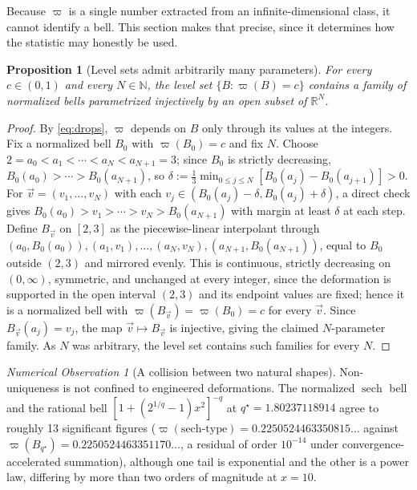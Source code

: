 \documentclass[11pt]{article}
\theoremstyle{definition}
\theoremstyle{plain}
\newtheorem{proposition}[definition]{Proposition}
\theoremstyle{remark}
\newtheorem{observation}[definition]{Numerical Observation}
\begin{document}
Because $\varpi$ is a single number extracted from an infinite-dimensional class, it
cannot identify a bell. This section makes that precise, since it determines how the
statistic may honestly be used.

\begin{proposition}[Level sets admit arbitrarily many parameters]\label{prop:levelsets}
For every $c\in(0,1)$ and every $N\in\mathbb N$, the level set $\{B:\varpi(B)=c\}$
contains a family of normalized bells parametrized injectively by an open subset of
$\mathbb R^N$.
\end{proposition}

\begin{proof}
By \eqref{eq:drops}, $\varpi$ depends on $B$ only through its values at the integers.
Fix a normalized bell $B_0$ with $\varpi(B_0)=c$ and fix $N$. Choose
$2=a_0<a_1<\cdots<a_N<a_{N+1}=3$; since $B_0$ is strictly decreasing,
$B_0(a_0)>\cdots>B_0(a_{N+1})$, so
$\delta:=\tfrac13\min_{0\le j\le N}[B_0(a_j)-B_0(a_{j+1})]>0$. For
$\vec v=(v_1,\ldots,v_N)$ with each $v_j\in(B_0(a_j)-\delta,B_0(a_j)+\delta)$, a direct
check gives $B_0(a_0)>v_1>\cdots>v_N>B_0(a_{N+1})$ with margin at least $\delta$ at
each step. Define $B_{\vec v}$ on $[2,3]$ as the piecewise-linear interpolant through
$(a_0,B_0(a_0)),(a_1,v_1),\ldots,(a_N,v_N),(a_{N+1},B_0(a_{N+1}))$, equal to $B_0$
outside $(2,3)$ and mirrored evenly. This is continuous, strictly decreasing on
$(0,\infty)$, symmetric, and unchanged at every integer, since the deformation is
supported in the open interval $(2,3)$ and its endpoint values are fixed; hence it is a
normalized bell with $\varpi(B_{\vec v})=\varpi(B_0)=c$ for every $\vec v$. Since
$B_{\vec v}(a_j)=v_j$, the map $\vec v\mapsto B_{\vec v}$ is injective, giving the
claimed $N$-parameter family. As $N$ was arbitrary, the level set contains such
families for every $N$.
\end{proof}

\begin{observation}[A collision between two natural shapes]\label{obs:collide}
Non-uniqueness is not confined to engineered deformations. The normalized
$\operatorname{sech}$ bell and the rational bell
$\left[1+(2^{1/q}-1)x^2\right]^{-q}$ at $q^\star=1.80237118914$ agree to roughly 13
significant figures ($\varpi(\mathrm{sech\text{-}type})=0.2250524463350815\ldots$
against $\varpi(B_{q^\star})=0.2250524463351170\ldots$, a residual of order $10^{-14}$
under convergence-accelerated summation), although one tail is exponential and the
other is a power law, differing by more than two orders of magnitude at $x=10$.
\end{observation}
\end{document}
